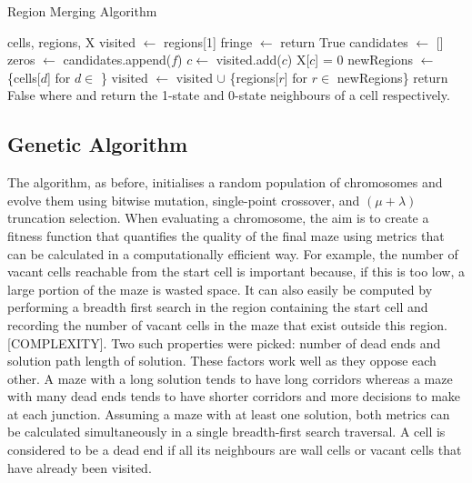 \begin{algorithm}
  \caption{Region Merging Algorithm}\label{alg:region-merge}
  \begin{algorithmic}
  \Require cells, regions, X
  \State visited $\gets$ regions[1]
    \State fringe $\gets$ 
        \State return True 
    \EndIf
    \State candidates $\gets$ []
        \State zeros $\gets$ 
            \State candidates.append($f$)
        \EndIf
    \EndFor
        \State $c \gets$ 
        \State visited.add($c$)
        \State X[$c$] = 0
        \State newRegions $\gets$ \{cells[$d$] for $d \in$ \}
        \State visited $\gets$ visited $\cup$ \{regions[$r$] for $r \in$ newRegions\}
    \Else
        \State return False 
    \EndIf
  \EndWhile
  \State
  \State where  and  return the 1-state and 0-state neighbours of a cell respectively.
  \end{algorithmic}
\end{algorithm}


\subsection{Genetic Algorithm}

The algorithm, as before, initialises a random population of chromosomes and evolve them using bitwise mutation, single-point crossover, and $(\mu + \lambda)$ truncation selection. When evaluating a chromosome, the aim is to create a fitness function that quantifies the quality of the final maze using metrics that can be calculated in a computationally efficient way. For example, the number of vacant cells reachable from the start cell is important because, if this is too low, a large portion of the maze is wasted space. It can also easily be computed by performing a breadth first search in the region containing the start cell and recording the number of vacant cells in the maze that exist outside this region.[COMPLEXITY]. Two such properties were picked: number of dead ends and solution path length of solution. These factors work well as they oppose each other. A maze with a long solution tends to have long corridors whereas a maze with many dead ends tends to have shorter corridors and more decisions to make at each junction. Assuming a maze with at least one solution, both metrics can be calculated simultaneously in a single breadth-first search traversal. A cell is considered to be a dead end if all its neighbours are wall cells or vacant cells that have already been visited.\\

